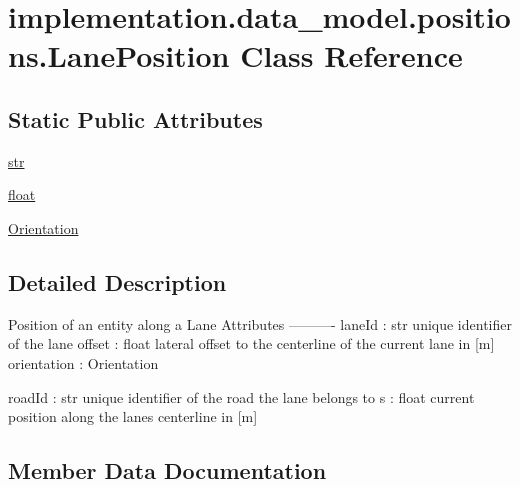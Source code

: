 \hypertarget{classimplementation_1_1data__model_1_1positions_1_1_lane_position}{}\section{implementation.\+data\+\_\+model.\+positions.\+Lane\+Position Class Reference}
\label{classimplementation_1_1data__model_1_1positions_1_1_lane_position}
\subsection*{Static Public Attributes}
\begin{DoxyCompactItemize}
\item 
\hyperlink{classimplementation_1_1data__model_1_1positions_1_1_lane_position_ac9c876221453d49a2c5414cd415749f2}{str}
\item 
\hyperlink{classimplementation_1_1data__model_1_1positions_1_1_lane_position_a09c02454c62ee6bb98ceeac42db071fc}{float}
\item 
\hyperlink{classimplementation_1_1data__model_1_1positions_1_1_lane_position_a93831a9eeb1d5a073bbd0e30c8aec569}{Orientation}
\end{DoxyCompactItemize}


\subsection{Detailed Description}
\begin{DoxyVerb}Position of an entity along a Lane
Attributes
----------
laneId : str
    unique identifier of the lane
offset : float
    lateral offset to the centerline of the current lane in [m]
orientation : Orientation

roadId : str
    unique identifier of the road the lane belongs to
s : float
    current position along the lanes centerline in [m]
\end{DoxyVerb}
 

\subsection{Member Data Documentation}
\mbox{\label{classimplementation_1_1data__model_1_1positions_1_1_lane_position_a09c02454c62ee6bb98ceeac42db071fc}} 
